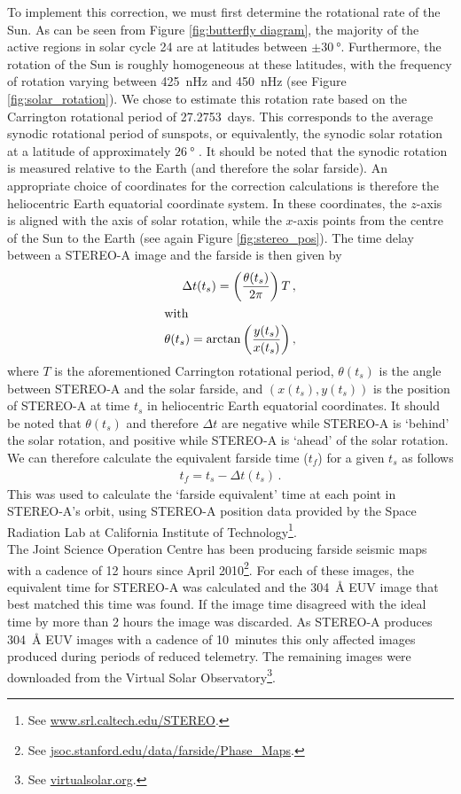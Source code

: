 \documentclass[11pt,a4paper,onecolumn]{report}
\begin{document}
To implement this correction, we must first determine the rotational rate of the
Sun. As can be seen from Figure \ref{fig:butterfly diagram}, the majority of the
active regions in solar cycle 24 are at latitudes between $\pm
\SI{30}{\degree}$. Furthermore, the rotation of the Sun is roughly homogeneous
at these latitudes, with the frequency of rotation varying between \SI{425}{nHz}
and \SI{450}{nHz} (see Figure \ref{fig:solar_rotation}). We chose to estimate
this rotation rate based on the Carrington rotational period of
\SI{27.2753}{days}. This corresponds to the average synodic rotational period of
sunspots, or equivalently, the synodic solar rotation at a latitude of
approximately \(\SI[]{26}[]{\degree}\) \citep{carrington_observations_1863}. It
should be noted that the synodic rotation is measured relative to the Earth (and
therefore the solar farside). An appropriate choice of coordinates for the
correction calculations is therefore the heliocentric Earth equatorial
coordinate system. In these coordinates, the $z$-axis is aligned with the axis
of solar rotation, while the $x$-axis points from the centre of the Sun to the
Earth (see again Figure \ref{fig:stereo_pos}). The time delay between a STEREO-A
image and the farside is then given by
\begin{align}
  \Delta t(t_s) = \left(\frac{\theta(t_s)}{2\pi}\right)T \, ,\\
  \intertext{with}
  \theta(t_s) = \arctan{\left(\frac{y(t_s)}{x(t_s)}\right)} \, ,
\end{align}
where $T$ is the aforementioned Carrington rotational period, $\theta(t_s)$ is
the angle between STEREO-A and the solar farside, and $(x(t_s), y(t_s))$ is the
position of STEREO-A at time $t_s$ in heliocentric Earth equatorial coordinates.
It should be noted that $\theta(t_s)$ and therefore $\Delta t$ are negative
while STEREO-A is `behind' the solar rotation, and positive while STEREO-A is
`ahead' of the solar rotation. We can therefore calculate the equivalent farside
time ($t_f$) for a given $t_s$ as follows
\begin{align}
  t_f = t_s - \Delta t(t_s) \, .
\end{align}
This was used to calculate the `farside equivalent' time at each point in
STEREO-A's orbit, using STEREO-A position data provided by the Space Radiation
Lab at California Institute of Technology\footnote{See
\url{www.srl.caltech.edu/STEREO}.}. \\

The Joint Science Operation Centre has been producing farside seismic maps with
a cadence of 12 hours since April 2010\footnote{See
\url{jsoc.stanford.edu/data/farside/Phase_Maps}.}. For each of these images, the
equivalent time for STEREO-A was calculated and the \SI{304}{\angstrom} EUV image
that best matched this time was found. If the image time disagreed with the
ideal time by more than 2 hours the image was discarded. As STEREO-A produces
\SI{304}{\angstrom} EUV images with a cadence of \SI{10}{minutes} this only
affected images produced during periods of reduced telemetry. The remaining
images were downloaded from the Virtual Solar Observatory\footnote{See
\url{virtualsolar.org}.}. \\
\end{document}
